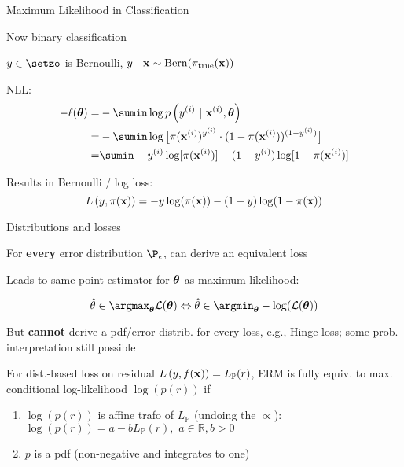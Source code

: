 \documentclass[11pt,compress,t,notes=noshow, xcolor=table]{beamer}
\begin{document}
\begin{framei}[sep=M]{Maximum Likelihood in Classification}

\item Now binary classification
\item $y \in \setzo$ is Bernoulli, $y ~|~ \mathbf{x} \sim \text{Bern}(\pi_\text{true}(\mathbf{x}))$
\item  NLL:
\begin{align*}
- \loglt =& -\sumin \lpdfyigxit \\ 
=& - \sumin \log \big[\pi(\xi)^{y^{(i)}} \cdot (1 - \pi(\xi))^{(1 - y^{(i)})} \big]\\
=& \sumin -\yi \log[\pi(\xi)] - (1-\yi) \log [1 - \pi(\xi)]
\end{align*}
\item Results in Bernoulli / log loss:
$$
L\left(y, \pi(\mathbf{x})\right) = -y\log(\pi(\mathbf{x}))-(1-y)\log(1-\pi(\mathbf{x}))
$$

\end{framei}


\begin{framei}[sep=L]{Distributions and losses}

\item For \textbf{every} error distribution $\P_\eps$, can derive an equivalent loss
\item Leads to same point estimator for $\bm{\theta}$ as maximum-likelihood:

$$
\thetah \in \argmax_{\thetav} \LL(\thetav) \Leftrightarrow \thetah \in \argmin_{\thetav}-\log(\LL(\thetav))
$$
    
\item But \textbf{cannot} derive a pdf/error distrib. for every loss, e.g., Hinge loss; some prob. interpretation still possible 

\item For dist.-based loss on residual $L\left(y, f(\mathbf{x})\right)=L_{\mathbb{P}}(r)$, ERM is fully equiv. to max. conditional log-likelihood $\log(p(r))$ if
\begin{enumerate}
\item $\log(p(r))$ is affine trafo of $L_{\mathbb{P}}$ (undoing the $\propto$):
$\log(p(r)) = a - bL_{\mathbb{P}}(r),\,\,a \in \mathbb{R}, b>0$
\item  $p$ is a pdf (non-negative and integrates to one)
\end{enumerate}

\end{framei}


\endlecture
\end{document}
